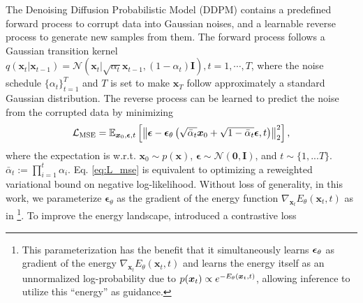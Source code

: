 The Denoising Diffusion Probabilistic Model (DDPM) \cite{ho2020denoising} contains a predefined forward process to corrupt data into Gaussian noises, and a learnable reverse process to generate new samples from them. The forward process follows a Gaussian transition kernel $q(\boldsymbol{x}_t\vert\boldsymbol{x}_{t-1})=\mathcal N(\boldsymbol{x}_t\vert \sqrt{\alpha_t}\boldsymbol{x}_{t-1}, (1-\alpha_t)\boldsymbol I), t=1, \cdots, T$, where the noise schedule $\{\alpha_t\}_{t=1}^T$ and $T$ is set to make $\boldsymbol{x}_T$ follow approximately a standard Gaussian distribution. The reverse process can be learned to predict the noise from the corrupted data by minimizing \begin{equation}\label{eq:L_mse}
{\mathcal{L}}_\text{MSE}={\mathbb{E}}_{{\boldsymbol{x}}_0,{\boldsymbol{\epsilon}},t}\left[\left\|\boldsymbol{\epsilon}-\boldsymbol{\epsilon}_{\theta}\left(\sqrt{\bar{\alpha}_{t}} \boldsymbol{x}_{0}+\sqrt{1-\bar{\alpha}_{t}} \boldsymbol{\epsilon}, t\right)\right\|_{2}^{2}\right],
\end{equation}
where the expectation is w.r.t.  $\boldsymbol{x}_{0}\sim p(\boldsymbol{x})$, $\boldsymbol{\epsilon}\sim\mathcal{N}(\boldsymbol{0}, \boldsymbol{I})$, and $t\sim \{1,...T\}$. $\bar{\alpha}_{t}:=\prod_{i=1}^{t} \alpha_{i}$. Eq. \ref{eq:L_mse} is equivalent to optimizing a reweighted variational bound on negative log-likelihood. Without loss of generality, in this work, we parameterize $\boldsymbol{\epsilon}_\theta$ as the gradient of the energy function $\nabla_{\boldsymbol{x}_t} E_\theta(\boldsymbol{x}_t, t)$ as in \citet{du2023reduce}\footnote{This parameterization has the benefit that it simultaneously learns ${\boldsymbol{\epsilon}}_\theta$ as gradient of the energy $\nabla_{\boldsymbol{x}_t} E_\theta(\boldsymbol{x}_t, t)$ and learns the energy itself as an unnormalized log-probability due to $p({\boldsymbol{x}}_t)\propto e^{-E_\theta({\boldsymbol{x}}_t,t)}$, allowing inference to utilize this ``energy'' as guidance.}. To improve the energy landscape, \citet{du2024learning} introduced a contrastive loss 
